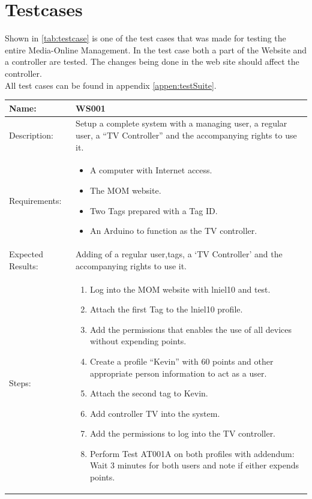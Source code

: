 \section{Testcases}
\label{sec:testcase}
Shown in \autoref{tab:testcase} is one of the test cases that was made for testing the entire Media-Online Management. In the test case both a part of the Website and a controller are tested. The changes being done in the web site should affect the controller.\\ 
 All test cases can be found in appendix \vref{appen:testSuite}.
\begin{table}[h]
	\centering
		\begin{tabular*}{\textwidth}{|l|l|}
		\hline
		\hline
		Name: & WS001\\
		\hline
		Description: & \parbox{0.70\textwidth}{Setup a complete system with a managing user, a regular user, a ``TV Controller'' and the accompanying rights to use it.}\\
		\hline
		Requirements: & \parbox{0.70\textwidth}{
		\begin{itemize}
			\item A computer with Internet access.
			\item The MOM website.
			\item Two Tags prepared with a Tag ID.
			\item An Arduino to function as the TV controller. 
		\end{itemize}}
		\\
		\hline
		Expected Results: & \parbox{.70\textwidth}{Adding of a regular user,tags, a `TV Controller' and the accompanying rights to use it.}\\
		\hline
		Steps: & \parbox{.70\textwidth}{
		\begin{enumerate}
			\item Log into the MOM website with lniel10 and test.
			\item Attach the first Tag to the lniel10 profile.
			\item Add the permissions that enables the use of all devices without expending points.
			\item Create a profile ``Kevin'' with 60 points and other appropriate person information to act as a user.
			\item Attach the second tag to Kevin.
			\item Add controller TV into the system.
			\item Add the permissions to log into the TV controller.
			\item Perform Test AT001A on both profiles with addendum: Wait 3 minutes for both users and note if either expends points.
		\end{enumerate}}
		\\		
		\hline
		\end{tabular*}
\end{table}


